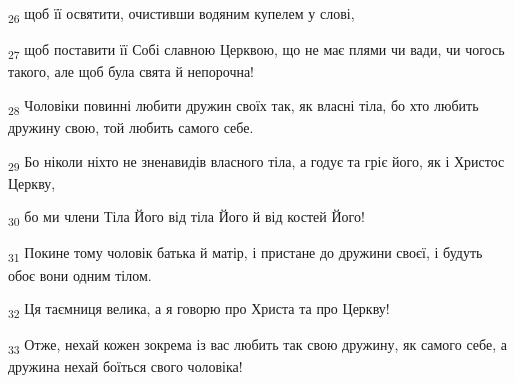 \begin{tcolorbox}
\textsubscript{26} щоб її освятити, очистивши водяним купелем у слові,
\end{tcolorbox}
\begin{tcolorbox}
\textsubscript{27} щоб поставити її Собі славною Церквою, що не має плями чи вади, чи чогось такого, але щоб була свята й непорочна!
\end{tcolorbox}
\begin{tcolorbox}
\textsubscript{28} Чоловіки повинні любити дружин своїх так, як власні тіла, бо хто любить дружину свою, той любить самого себе.
\end{tcolorbox}
\begin{tcolorbox}
\textsubscript{29} Бо ніколи ніхто не зненавидів власного тіла, а годує та гріє його, як і Христос Церкву,
\end{tcolorbox}
\begin{tcolorbox}
\textsubscript{30} бо ми члени Тіла Його від тіла Його й від костей Його!
\end{tcolorbox}
\begin{tcolorbox}
\textsubscript{31} Покине тому чоловік батька й матір, і пристане до дружини своєї, і будуть обоє вони одним тілом.
\end{tcolorbox}
\begin{tcolorbox}
\textsubscript{32} Ця таємниця велика, а я говорю про Христа та про Церкву!
\end{tcolorbox}
\begin{tcolorbox}
\textsubscript{33} Отже, нехай кожен зокрема із вас любить так свою дружину, як самого себе, а дружина нехай боїться свого чоловіка!
\end{tcolorbox}

